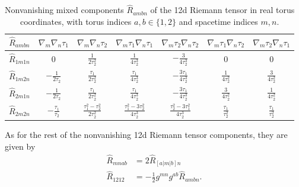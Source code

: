 \begin{table}[ht]
\centering
{\small
\setlength{\tabcolsep}{6pt}
\renewcommand{\arraystretch}{1.4}
\begin{tabular}{ccccccc}
\toprule
$\widehat{R}_{ambn}$
  & $\nabla_m\nabla_n\tau_1$
  & $\nabla_m\nabla_n\tau_2$
  & $\nabla_m\tau_1\nabla_n\tau_1$
  & $\nabla_m\tau_2\nabla_n\tau_2$
  & $\nabla_m\tau_1\nabla_n\tau_2$
  & $\nabla_m\tau_2\nabla_n\tau_1$ \\
\midrule
$\widehat{R}_{1m1n}$ & $0$ & $\frac{1}{2\tau_2^2}$ & $\frac{1}{4\tau_2^3}$ & $-\frac{3}{4\tau_2^3}$ & $0$ & $0$ \\
$\widehat{R}_{1m2n}$ & $-\frac{1}{2\tau_2}$ & $\frac{\tau_1}{2\tau_2^2}$ & $\frac{\tau_1}{4\tau_2^3}$ & $-\frac{3\tau_1}{4\tau_2^3}$ & $\frac{1}{4\tau_2^2}$ & $\frac{3}{4\tau_2^2}$ \\
$\widehat{R}_{2m1n}$ & $-\frac{1}{2\tau_2}$ & $\frac{\tau_1}{2\tau_2^2}$ & $\frac{\tau_1}{4\tau_2^3}$ & $-\frac{3\tau_1}{4\tau_2^3}$ & $\frac{3}{4\tau_2^2}$ & $\frac{1}{4\tau_2^2}$ \\
$\widehat{R}_{2m2n}$ & $-\frac{\tau_1}{\tau_2}$ & $\frac{\tau_1^2-\tau_2^2}{2\tau_2^2}$ & $\frac{\tau_1^2-3\tau_2^2}{4\tau_2^3}$ & $\frac{\tau_2^2-3\tau_1^2}{4\tau_2^3}$ & $\frac{\tau_1}{\tau_2^2}$ & $\frac{\tau_1}{\tau_2^2}$ \\
\bottomrule
\end{tabular}
}
\medskip
\caption{Nonvanishing mixed components $\widehat{R}_{ambn}$ of the 12d Riemann tensor in real torus coordinates, with torus indices $a,b\in\{1,2\}$ and spacetime indices $m,n$.}%
\label{tab:12d-Riemann-components}
\end{table}

As for the rest of the nonvanishing 12d Riemann tensor components, they are given by
\begin{equation}
\begin{aligned}
\widehat{R}_{mnab} 
&= 2\widehat{R}_{[a|m|b]n}\\
\widehat{R}_{1212}
&= -\frac{1}{2}g^{mn}g^{ab} \widehat{R}_{ambn}.
\end{aligned}
\end{equation}

